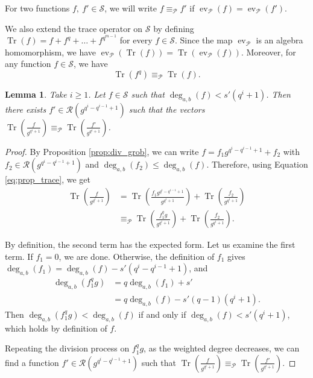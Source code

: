 \documentclass[lettersize,journal]{IEEEtran}
\theoremstyle{plain}
\newtheorem{lemma}[thm]{Lemma}
\theoremstyle{definition}
\theoremstyle{remark}
\DeclareMathOperator{\ev}{ev}
\DeclareMathOperator{\trace}{Tr}
\newcommand{\calP}{\mathcal{P}}
\newcommand{\calR}{\mathcal{R}}
\newcommand{\calS}{\mathcal{S}}
\newcommand{\Tr}[1]{\trace\!\left(#1\right)}
\newcommand{\degab}[1]{\deg_{a,b}\left(#1\right)}
\begin{document}
	For two functions $f,\: f' \in \calS$, we will write $f \equiv_{\calP} f'$ if $\ev_{\calP}(f)=\ev_{\calP}(f')$.
	
	We also extend the trace operator on $\calS$ by defining $\Tr{f}=f+f^q+\dots + f^{q^{m-1}}$ for every $f \in \calS$.
	Since the map $\ev_{\calP}$ is an algebra homomorphism, we have $\ev_{\calP} \left(\Tr{f}\right)=\Tr{\ev_{\calP}(f)}$. Moreover, for any function $f \in \calS$, we have
	\begin{equation}\label{eq:prop_trace}
		\Tr{f^q} \equiv_{\calP}\Tr{f}.
	\end{equation}
	
	
	
	
	
	\begin{lemma} \label{lem:weighted_division}
		Take $i \geq 1$. Let $f\in \calS$ such that $\degab{f} < s'(q^i+1)$. Then there exists $f' \in \calR\left(g^{q^i-q^{i-1}+1}\right)$ such that the vectors  $\Tr{\frac{f}{g^{q^i+1}}} \equiv_{\calP}\Tr{\frac{f'}{g^{q^i+1}}}$.
	\end{lemma}
	
	\begin{proof}
		By Proposition \ref{prop:div_grob}, we can write $f=f_1 g^{q^i-q^{i-1}+1} +f_2$ with
		$f_2 \in \calR\left(g^{q^i-q^{i-1}+1}\right)$ and $\degab{f_2} \leq \degab{f}$. Therefore, using Equation \eqref{eq:prop_trace}, we get
		\[\begin{aligned}
			\Tr{\frac{f}{g^{q^i+1}}}&=\Tr{\frac{f_1 g^{q^i-q^{i-1}+1}}{g^{q^i+1}}} +\Tr{\frac{f_2}{g^{q^i+1}}}\\
			&\equiv_{\calP} \Tr{\frac{f_1^qg}{g^{q^i+1}}} +\Tr{\frac{f_2}{g^{q^i+1}}}.
		\end{aligned}\]
		
		By definition, the second term has the expected form. Let us examine the first term. If $f_1=0$, we are done. Otherwise, the definition of $f_1$ gives
		$\degab{f_1} =\degab{f} - s'(q^i-q^{i-1}+1)$, and
		\begin{align*}
			\degab{f_1^qg}  &= q \degab{f_1} + s'\\
			&= q\degab{f} - s'(q-1)(q^i+1).
		\end{align*} 
		Then  $\degab{f_1^qg} < \degab{f}$ if and only if $\degab{f} < s'(q^i+1)$, which holds by definition of $f$. 
		
		Repeating the division process on $f_1^qg$, as the weighted degree decreases, we can find a function $f' \in \calR\left(g^{q^i-q^{i-1}+1}\right)$ such that $\Tr{\frac{f}{g^{q^i+1}}} \equiv_{\calP} \Tr{\frac{f'}{g^{q^i+1}}} $.
	\end{proof}
	
\end{document}
